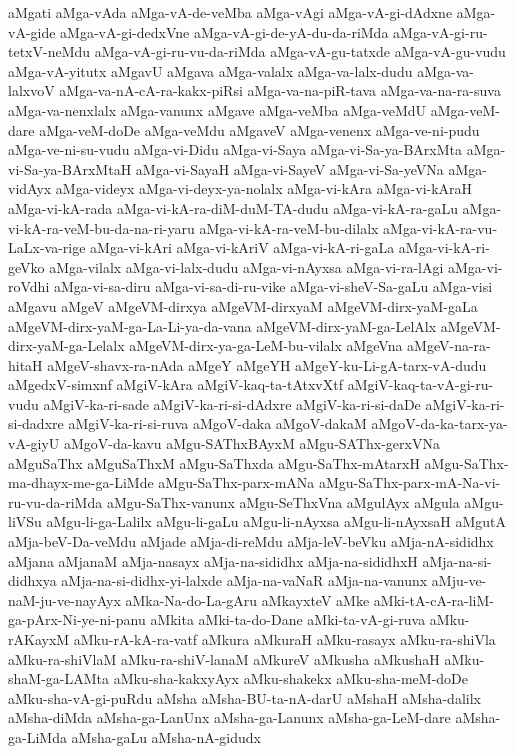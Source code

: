 {aMgati
aMga-vAda
aMga-vA-de-veMba
aMga-vAgi
aMga-vA-gi-dAdxne
aMga-vA-gide
aMga-vA-gi-dedxVne
aMga-vA-gi-de-yA-du-da-riMda
aMga-vA-gi-ru-tetxV-neMdu
aMga-vA-gi-ru-vu-da-riMda
aMga-vA-gu-tatxde
aMga-vA-gu-vudu
aMga-vA-yitutx
aMgavU
aMgava
aMga-valalx
aMga-va-lalx-dudu
aMga-va-lalxvoV
aMga-va-nA-cA-ra-kakx-piRsi
aMga-va-na-piR-tava
aMga-va-na-ra-suva
aMga-va-nenxlalx
aMga-vanunx
aMgave
aMga-veMba
aMga-veMdU
aMga-veM-dare
aMga-veM-doDe
aMga-veMdu
aMgaveV
aMga-venenx
aMga-ve-ni-pudu
aMga-ve-ni-su-vudu
aMga-vi-Didu
aMga-vi-Saya
aMga-vi-Sa-ya-BArxMta
aMga-vi-Sa-ya-BArxMtaH
aMga-vi-SayaH
aMga-vi-SayeV
aMga-vi-Sa-yeVNa
aMga-vidAyx
aMga-videyx
aMga-vi-deyx-ya-nolalx
aMga-vi-kAra
aMga-vi-kAraH
aMga-vi-kA-rada
aMga-vi-kA-ra-diM-duM-TA-dudu
aMga-vi-kA-ra-gaLu
aMga-vi-kA-ra-veM-bu-da-na-ri-yaru
aMga-vi-kA-ra-veM-bu-dilalx
aMga-vi-kA-ra-vu-LaLx-va-rige
aMga-vi-kAri
aMga-vi-kAriV
aMga-vi-kA-ri-gaLa
aMga-vi-kA-ri-geVko
aMga-vilalx
aMga-vi-lalx-dudu
aMga-vi-nAyxsa
aMga-vi-ra-lAgi
aMga-vi-roVdhi
aMga-vi-sa-diru
aMga-vi-sa-di-ru-vike
aMga-vi-sheV-Sa-gaLu
aMga-visi
aMgavu
aMgeV
aMgeVM-dirxya
aMgeVM-dirxyaM
aMgeVM-dirx-yaM-gaLa
aMgeVM-dirx-yaM-ga-La-Li-ya-da-vana
aMgeVM-dirx-yaM-ga-LelAlx
aMgeVM-dirx-yaM-ga-Lelalx
aMgeVM-dirx-ya-ga-LeM-bu-vilalx
aMgeVna
aMgeV-na-ra-hitaH
aMgeV-shavx-ra-nAda
aMgeY
aMgeYH
aMgeY-ku-Li-gA-tarx-vA-dudu
aMgedxV-simxnf
aMgiV-kAra
aMgiV-kaq-ta-tAtxvXtf
aMgiV-kaq-ta-vA-gi-ru-vudu
aMgiV-ka-ri-sade
aMgiV-ka-ri-si-dAdxre
aMgiV-ka-ri-si-daDe
aMgiV-ka-ri-si-dadxre
aMgiV-ka-ri-si-ruva
aMgoV-daka
aMgoV-dakaM
aMgoV-da-ka-tarx-ya-vA-giyU
aMgoV-da-kavu
aMgu-SAThxBAyxM
aMgu-SAThx-gerxVNa
aMguSaThx
aMguSaThxM
aMgu-SaThxda
aMgu-SaThx-mAtarxH
aMgu-SaThx-ma-dhayx-me-ga-LiMde
aMgu-SaThx-parx-mANa
aMgu-SaThx-parx-mA-Na-vi-ru-vu-da-riMda
aMgu-SaThx-vanunx
aMgu-SeThxVna
aMgulAyx
aMgula
aMgu-liVSu
aMgu-li-ga-Lalilx
aMgu-li-gaLu
aMgu-li-nAyxsa
aMgu-li-nAyxsaH
aMgutA
aMja-beV-Da-veMdu
aMjade
aMja-di-reMdu
aMja-leV-beVku
aMja-nA-sididhx
aMjana
aMjanaM
aMja-nasayx
aMja-na-sididhx
aMja-na-sididhxH
aMja-na-si-didhxya
aMja-na-si-didhx-yi-lalxde
aMja-na-vaNaR
aMja-na-vanunx
aMju-ve-naM-ju-ve-nayAyx
aMka-Na-do-La-gAru
aMkayxteV
aMke
aMki-tA-cA-ra-liM-ga-pArx-Ni-ye-ni-panu
aMkita
aMki-ta-do-Dane
aMki-ta-vA-gi-ruva
aMku-rAKayxM
aMku-rA-kA-ra-vatf
aMkura
aMkuraH
aMku-rasayx
aMku-ra-shiVla
aMku-ra-shiVlaM
aMku-ra-shiV-lanaM
aMkureV
aMkusha
aMkushaH
aMku-shaM-ga-LAMta
aMku-sha-kakxyAyx
aMku-shakekx
aMku-sha-meM-doDe
aMku-sha-vA-gi-puRdu
aMsha
aMsha-BU-ta-nA-darU
aMshaH
aMsha-dalilx
aMsha-diMda
aMsha-ga-LanUnx
aMsha-ga-Lanunx
aMsha-ga-LeM-dare
aMsha-ga-LiMda
aMsha-gaLu
aMsha-nA-gidudx
}
